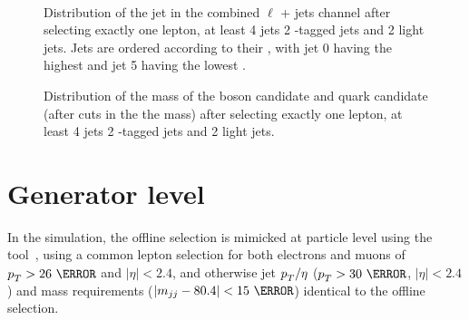 \begin{figure}[hbtp]
\centering
  \def\twidth{0.32}
  \centering
  \hfill
  \hfill
  \\
    \hfill
  \hfill

\caption{Distribution of the jet \pt in the combined $\ell$ + jets channel after selecting exactly one lepton, at least 4 jets 2 \cPqb-tagged jets and 2 light jets. Jets are ordered according to their \pt, with jet 0 having the highest \pt and jet 5 having the lowest \pt.}
\label{fig:L4_1l4j2b2w_j4pt}
\end{figure}

\begin{figure}[hbtp]
\centering
  \def\twidth{0.32}
  \centering
  \hfil
\caption{Distribution of the mass of the \PW boson candidate and \cPqt quark candidate (after cuts in the the \PW mass) after selecting exactly one lepton, at least 4 jets 2 \cPqb-tagged jets and 2 light jets.}
\label{fig:L4_1l4j2b2w_twcandm}
\end{figure}

\section{Generator level}
\label{sec:generator_level}

In the simulation, the offline selection is mimicked at particle level using the \PSEUDOTOPPRODUCER tool~\cite{code:pseudotop}, using a common lepton selection for both electrons and muons of $\pt>26~\GeV$ and $|\eta| < 2.4$, and otherwise jet $p_{T}^{}/\eta$ ($\pt>30~\GeV$, $|\eta|<2.4$) and \PW mass requirements ($\left|m_{jj}-80.4\right|<15~\GeV$) identical to the offline selection.

